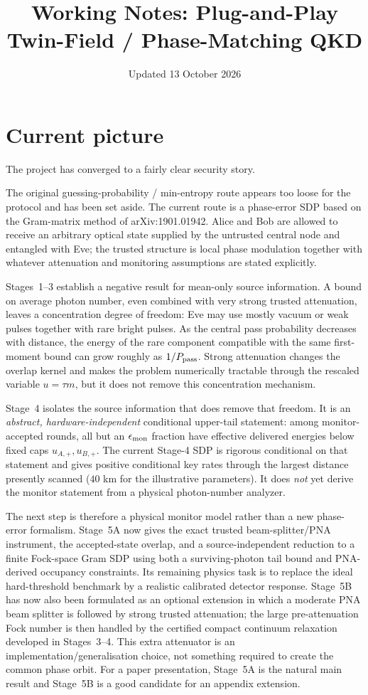 \documentclass[11pt]{article}
\title{Working Notes: Plug-and-Play Twin-Field / Phase-Matching QKD}
\author{}
\date{Updated 13 October 2026}
\theoremstyle{remark}
\begin{document}
\maketitle

\section{Current picture}

The project has converged to a fairly clear security story.

The original guessing-probability / min-entropy route appears too loose for the
protocol and has been set aside. The current route is a phase-error SDP based
on the Gram-matrix method of arXiv:1901.01942.  Alice and Bob are allowed to
receive an arbitrary optical state supplied by the untrusted central node and
entangled with Eve; the trusted structure is local phase modulation together
with whatever attenuation and monitoring assumptions are stated explicitly.

Stages~1--3 establish a negative result for mean-only source information.
A bound on average photon number, even combined with very strong trusted
attenuation, leaves a concentration degree of freedom: Eve may use mostly
vacuum or weak pulses together with rare bright pulses.  As the central pass
probability decreases with distance, the energy of the rare component
compatible with the same first-moment bound can grow roughly as
\(1/P_{\rm pass}\).  Strong attenuation changes the overlap kernel and makes
the problem numerically tractable through the rescaled variable
\(u=\tau m\), but it does not remove this concentration mechanism.

Stage~4 isolates the source information that does remove that freedom.  It is
an \emph{abstract, hardware-independent} conditional upper-tail statement:
among monitor-accepted rounds, all but an \(\epsilon_{\rm mon}\) fraction have
effective delivered energies below fixed caps \(u_{A,+},u_{B,+}\).  The
current Stage-4 SDP is rigorous conditional on that statement and gives
positive conditional key rates through the largest distance presently scanned
(\(40\) km for the illustrative parameters).  It does \emph{not} yet derive
the monitor statement from a physical photon-number analyzer.

The next step is therefore a physical monitor model rather than a new
phase-error formalism.  Stage~5A now gives the exact trusted beam-splitter/PNA
instrument, the accepted-state overlap, and a source-independent reduction to
a finite Fock-space Gram SDP using both a surviving-photon tail bound and
PNA-derived occupancy constraints.  Its remaining physics task is to replace
the ideal hard-threshold benchmark by a realistic calibrated detector
response.  Stage~5B has now also been formulated as an optional extension in
which a moderate PNA beam splitter is followed by strong trusted attenuation;
the large pre-attenuation Fock number is then handled by the certified compact
continuum relaxation developed in Stages~3--4.  This extra attenuator is an
implementation/generalisation choice, not something required to create the
common phase orbit.  For a paper presentation, Stage~5A is the natural main
result and Stage~5B is a good candidate for an appendix extension.
\end{document}
